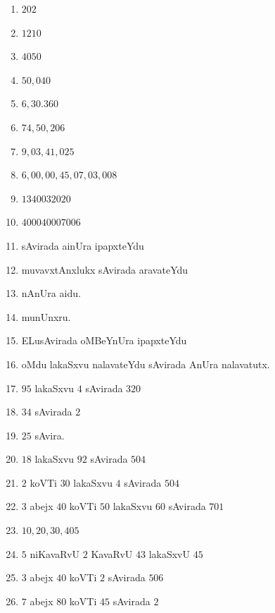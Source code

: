 


\begin{multicols}{2}
\begin{enumerate}[$1.$]
\item $202$
\item $1210$
\item $4050$
\item $50,040$
\item $6,30.360$
\item $74,50,206$
\item $9,03,41,025$
\item $6,00,00,45,07,03,008$
\item $1340032020$
\item $400040007006$
\item sAvirada ainUra ipapxteYdu
\item muvavxtAnxlukx sAvirada aravateYdu
\item nAnUra aidu.
\item munUnxru.
\item ELusAvirada oMBeYnUra ipapxteYdu
\item oMdu lakaSxvu nalavateYdu sAvirada AnUra nalavatutx.
\item $95$ lakaSxvu $4$ sAvirada $320$
\item $34$ sAvirada $2$
\item $25$ sAvira.
\item $18$ lakaSxvu $92$ sAvirada $504$
\item $2$ koVTi $30$ lakaSxvu $4$ sAvirada $504$
\item $3$ abejx $40$ koVTi $50$ lakaSxvu $60$ sAvirada $701$
\item $10,20,30,405$
\item $5$ niKavaRvU $2$ KavaRvU $43$ lakaSxvU $45$
\item $3$ abejx $40$ koVTi $2$ sAvirada $506$
\item $7$ abejx $80$ koVTi $45$ sAvirada $2$
\end{enumerate}
\end{multicols}


